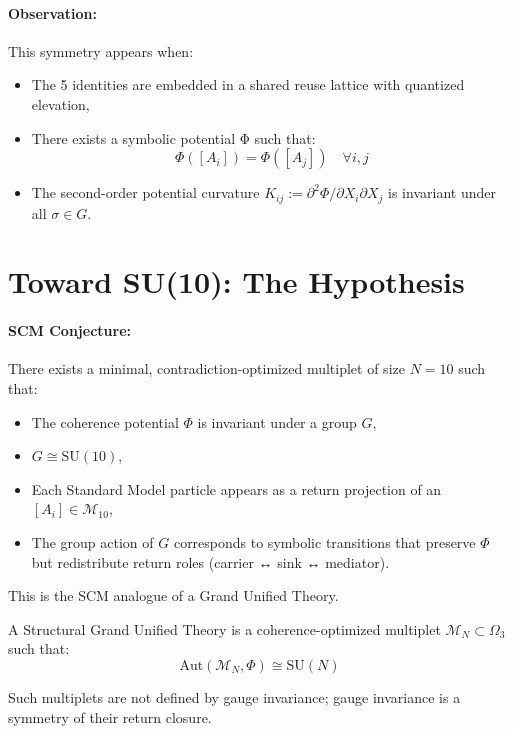 \paragraph{Observation:} This symmetry appears when:

\begin{itemize}
  \item The 5 identities are embedded in a shared reuse lattice with quantized elevation,
  \item There exists a symbolic potential Φ such that:
  \[
  \Phi([A_i]) = \Phi([A_j]) \quad \forall i,j
  \]
  \item The second-order potential curvature \( K_{ij} := \partial^2 \Phi / \partial X_i \partial X_j \) is invariant under all \( \sigma \in G \).
\end{itemize}

\section{Toward SU(10): The Hypothesis}

\paragraph{SCM Conjecture:} There exists a minimal, contradiction-optimized multiplet of size \( N = 10 \) such that:

\begin{itemize}
  \item The coherence potential \( \Phi \) is invariant under a group \( G \),
  \item \( G \cong \text{SU}(10) \),
  \item Each Standard Model particle appears as a return projection of an \( [A_i] \in \mathcal{M}_{10} \),
  \item The group action of \( G \) corresponds to symbolic transitions that preserve \( \Phi \) but redistribute return roles (carrier ↔ sink ↔ mediator).
\end{itemize}

This is the SCM analogue of a Grand Unified Theory.

\begin{definition}
A Structural Grand Unified Theory is a coherence-optimized multiplet \( \mathcal{M}_{N} \subset \Omega_3 \) such that:
\[
\text{Aut}(\mathcal{M}_{N}, \Phi) \cong \text{SU}(N)
\]
\end{definition}

Such multiplets are not defined by gauge invariance; gauge invariance is a symmetry of their return closure.

